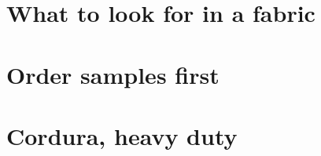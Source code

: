 \section{What to look for in a fabric}


\section{Order samples first}


\section{Cordura, heavy duty}


